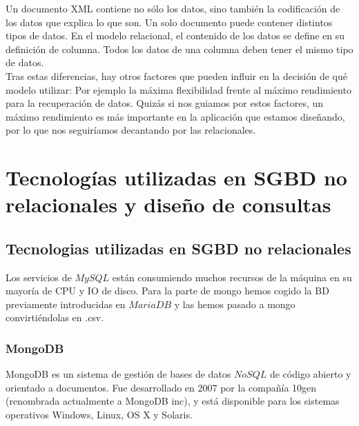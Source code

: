 \documentclass[12pt,a4paper]{article}
\begin{document}
Un documento XML contiene no sólo los datos, sino también la codificación de los datos que explica lo que son. Un solo documento puede contener distintos tipos de datos. En el modelo relacional, el contenido de los datos se define en su definición de columna. Todos los datos de una columna deben tener el mismo tipo de datos.\\

Tras estas diferencias, hay otros factores que pueden influir en la decisión de qué modelo utilizar: Por ejemplo la máxima flexibilidad frente al máximo rendimiento para la recuperación de datos. Quizás si nos guiamos por estos factores, un máximo rendimiento es más importante en la aplicación que estamos diseñando, por lo que nos seguiríamos decantando por las relacionales.




\newpage
\mbox{}
\newpage


\section{Tecnologías utilizadas en SGBD no relacionales y diseño de consultas} \label{pto5} 

\subsection{Tecnologias utilizadas en SGBD no relacionales}  \label{pto51}

Los servicios de $MySQL$ están consumiendo muchos recursos de la máquina en su mayoría de CPU y IO de disco.
Para la parte de mongo hemos cogido la BD previamente introducidas en $MariaDB$ y las hemos pasado a mongo convirtiéndolas en .csv.


\subsubsection{MongoDB} \label{pto511}

MongoDB es un sistema de gestión de bases de datos $NoSQL$ de código abierto y orientado a documentos. Fue desarrollado en 2007 por la compañía 10gen (renombrada actualmente a MongoDB inc), y está disponible para los sistemas operativos Windows, Linux, OS X y Solaris. \\
\end{document}
